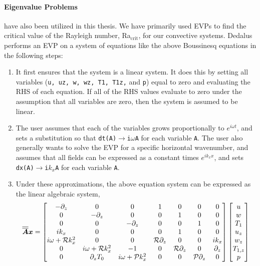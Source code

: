 \paragraph{Eigenvalue Problems} have also been utilized in this thesis.
We have primarily used EVPs to find the critical value of the Rayleigh number, Ra$_{\text{crit}}$, for our convective systems.
Dedalus performs an EVP on a system of equations like the above Boussinesq equations in the following steps:
\begin{enumerate}
\item It first ensures that the system is a linear system.
It does this by setting all variables (\texttt{u, uz, w, wz, T1, T1z,} and \texttt{p}) equal to zero and evaluating the RHS of each equation.
If all of the RHS values evaluate to zero under the assumption that all variables are zero, then the system is assumed to be linear.
\item The user assumes that each of the variables grows proportionally to $e^{i\omega t}$, and sets a substitution so that \texttt{dt(A)}$\rightarrow$\texttt{i$\omega$A} for each variable \texttt{A}.
The user also generally wants to solve the EVP for a specific horizontal wavenumber, and assumes that all fields can be expressed as a constant times $e^{i k_x x}$, and sets \texttt{dx(A)}$\rightarrow$\texttt{i$k_x$A} for each variable \texttt{A}.
\item Under these approximations, the above equation system can be expressed as the linear algebraic system,
\begin{equation}
\bm{\overline{\overline{A}}} \bm{x} = 
\begin{bmatrix}
-\partial_z 		& 0 					& 0 					& 1 			& 0 			& 0 				& 0 \\
0    				& -\partial_z 			& 0 					& 0 			& 1 			& 0 				& 0 \\
0    				& 0 					& -\partial_z 			& 0 			& 0 			& 1 				& 0 \\
ik_x 				& 0 					& 0 					& 0 			& 1 			& 0 				& 0 \\
i\omega + \mathcal{R} k_x^2 & 0						& 0						& \mathcal{R}\partial_z & 0				& 0 				& i k_x \\
0					& i\omega + \mathcal{R} k_x^2	& -1					& 0				& \mathcal{R}\partial_z & 0 				& \partial_z \\
0					& \partial_z T_0		& i\omega + \mathcal{P} k_x^2	& 0				& 0				& \mathcal{P}\partial_z		& 0
\end{bmatrix}
\begin{bmatrix}
u \\ w \\ T_1 \\ u_z \\ w_z \\ T_{1,z} \\ p

\end{bmatrix}
\end{equation}
\end{enumerate}

